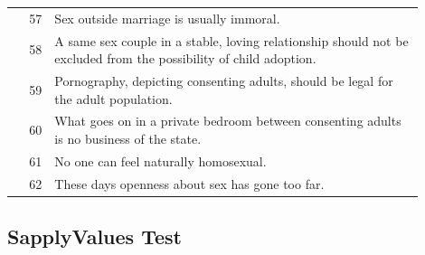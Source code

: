 \documentclass[11pt]{article}
\begin{document}
\begin{longtable}{r p{0.9\linewidth}}
\rowcolor{dom6} 57 & Sex outside marriage is usually immoral. \\
\rowcolor{dom6} 58 & A same sex couple in a stable, loving relationship should not be excluded from the possibility of child adoption. \\
\rowcolor{dom6} 59 & Pornography, depicting consenting adults, should be legal for the adult population. \\
\rowcolor{dom6} 60 & What goes on in a private bedroom between consenting adults is no business of the state. \\
\rowcolor{dom6} 61 & No one can feel naturally homosexual. \\
\rowcolor{dom6} 62 & These days openness about sex has gone too far. \\

\end{longtable}

\newpage
\subsection{SapplyValues Test}


\small
\renewcommand{\arraystretch}{1.2} %
\end{document}
